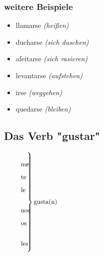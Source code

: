 \documentclass[10pt,spanish]{report}
\begin{document}
\subsubsection*{weitere Beispiele}
\begin{itemize}
  \item llamarse \textit{(heißen)}
  \item ducharse \textit{(sich duschen)}
  \item afeitarse \textit{(sich rasieren)}
  \item levantarse \textit{(aufstehen)}
  \item irse \textit{(weggehen)}
  \item quedarse \textit{(bleiben)}
\end{itemize}


\subsection*{Das Verb "gustar"}

$
\left.\parbox{0.1\textwidth}{%
\begin{itemize}
  \item[] me
  \item[] te   
  \item[] le   
  \item[] nos   
  \item[] os  
  \item[] les   
\end{itemize}
}\right\} \vbox{\noindent gusta(n)}
$
\end{document}
